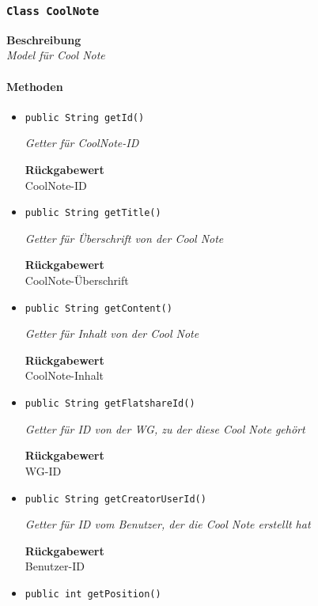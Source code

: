      \subsubsection{\texttt{Class CoolNote}}
     \textbf{Beschreibung} \\
     \textit{Model für Cool Note}
     \paragraph*{Methoden}
     \begin{itemize}
     	\item{\texttt{public String getId()}}
     	
     	\textit{Getter für CoolNote-ID}
     	
     	
     	
     	\textbf{Rückgabewert} \\
     	CoolNote-ID        \item{\texttt{public String getTitle()}}
     	
     	\textit{Getter für Überschrift von der Cool Note}
     	
     	
     	
     	\textbf{Rückgabewert} \\
     	CoolNote-Überschrift        \item{\texttt{public String getContent()}}
     	
     	\textit{Getter für Inhalt von der Cool Note}
     	
     	
     	
     	\textbf{Rückgabewert} \\
     	CoolNote-Inhalt        \item{\texttt{public String getFlatshareId()}}
     	
     	\textit{Getter für ID von der WG, zu der diese Cool Note gehört}
     	
     	
     	
     	\textbf{Rückgabewert} \\
     	WG-ID        \item{\texttt{public String getCreatorUserId()}}
     	
     	\textit{Getter für ID vom Benutzer, der die Cool Note erstellt hat}
     	
     	
     	
     	\textbf{Rückgabewert} \\
     	Benutzer-ID        \item{\texttt{public int getPosition()}}
     	

\end{itemize}
